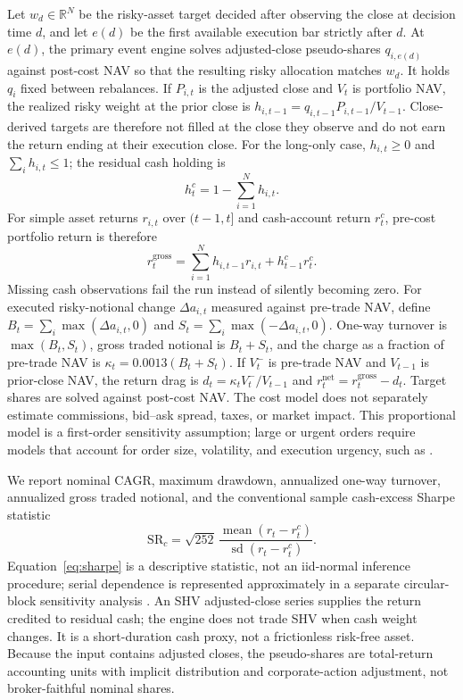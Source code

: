 \documentclass{article}
\begin{document}
Let $w_d\in\mathbb{R}^N$ be the risky-asset target decided after observing the
close at decision time $d$, and let $e(d)$ be the first available execution bar
strictly after $d$. At $e(d)$, the primary event engine solves adjusted-close
pseudo-shares $q_{i,e(d)}$ against post-cost NAV so that the resulting risky
allocation matches $w_d$. It holds $q_i$ fixed between rebalances. If $P_{i,t}$
is the adjusted close and $V_t$ is portfolio NAV, the realized risky weight at
the prior close is $h_{i,t-1}=q_{i,t-1}P_{i,t-1}/V_{t-1}$. Close-derived targets
are therefore not filled at the close they observe and do not earn the return
ending at their execution close. For the long-only case, $h_{i,t}\geq 0$ and
$\sum_i h_{i,t}\leq 1$; the residual cash holding is
\begin{equation}
  h^c_t = 1-\sum_{i=1}^N h_{i,t}.
\end{equation}
For simple asset returns $r_{i,t}$ over $(t-1,t]$ and cash-account return
$r^c_t$, pre-cost portfolio return is therefore
\begin{equation}
  r^{\mathrm{gross}}_t = \sum_{i=1}^N h_{i,t-1}r_{i,t}
  + h^c_{t-1}r^c_t.
  \label{eq:gross}
\end{equation}
Missing cash observations fail the run instead of silently becoming zero. For
executed risky-notional change $\Delta a_{i,t}$ measured against pre-trade NAV,
define $B_t=\sum_i\max(\Delta a_{i,t},0)$ and
$S_t=\sum_i\max(-\Delta a_{i,t},0)$. One-way turnover is
$\max(B_t,S_t)$, gross traded notional is $B_t+S_t$, and the charge as a
fraction of pre-trade NAV is $\kappa_t=0.0013(B_t+S_t)$. If $V^-_t$ is
pre-trade NAV and $V_{t-1}$ is prior-close NAV, the return drag is
$d_t=\kappa_t V^-_t/V_{t-1}$ and
$r^{\mathrm{net}}_t=r^{\mathrm{gross}}_t-d_t$. Target shares are solved against
post-cost NAV. The cost model does not separately estimate commissions,
bid--ask spread, taxes, or market
impact. This proportional model is a first-order sensitivity assumption; large
or urgent orders require models that account for order size, volatility, and
execution urgency, such as \citet{almgren2001execution}.

We report nominal CAGR, maximum drawdown, annualized one-way turnover,
annualized gross traded notional, and the conventional sample cash-excess
Sharpe statistic
\begin{equation}
  \mathrm{SR}_c = \sqrt{252}\,
  \frac{\operatorname{mean}(r_t-r^c_t)}
       {\operatorname{sd}(r_t-r^c_t)}.
  \label{eq:sharpe}
\end{equation}
Equation~\ref{eq:sharpe} is a descriptive statistic, not an iid-normal inference
procedure; serial dependence is represented approximately in a separate
circular-block sensitivity analysis \citep{lo2002statistics}. An SHV
adjusted-close series supplies the
return credited to residual cash; the
engine does not trade SHV when cash weight changes. It is a short-duration cash
proxy, not a frictionless risk-free asset. Because the input contains adjusted
closes, the pseudo-shares are total-return accounting units with implicit
distribution and corporate-action adjustment, not broker-faithful nominal
shares.
\end{document}
